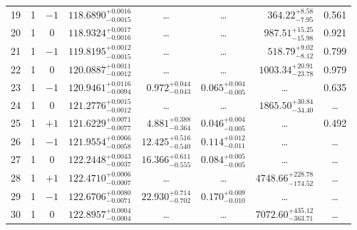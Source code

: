 \begin{table*}[!]
\begin{tabular}{llcrrlrc}
19 & 1 & $-1$ & $    118.6890_{-      0.0015}^{+      0.0016}$ & \multicolumn{1}{c}{\dots} & \multicolumn{1}{c}{\dots} & $      364.22_{-        7.95}^{+        8.58}$ & 0.561\\[1pt]
20 & 1 & 0 & $    118.9324_{-      0.0016}^{+      0.0017}$ & \multicolumn{1}{c}{\dots} & \multicolumn{1}{c}{\dots} & $      987.51_{-       15.98}^{+       15.25}$ & 0.921\\[1pt]
21 & 1 & $-1$ & $    119.8195_{-      0.0015}^{+      0.0012}$ & \multicolumn{1}{c}{\dots} & \multicolumn{1}{c}{\dots} & $      518.79_{-        8.12}^{+        9.02}$ & 0.799\\[1pt]
22 & 1 & 0 & $    120.0887_{-      0.0012}^{+      0.0011}$ & \multicolumn{1}{c}{\dots} & \multicolumn{1}{c}{\dots} & $     1003.34_{-       23.78}^{+       20.91}$ & 0.979\\[1pt]
23 & 1 & $-1$ & $    120.9461_{-      0.0094}^{+      0.0116}$ & $       0.972_{-       0.043}^{+       0.044}$ & $       0.065_{-       0.005}^{+       0.004}$ & \multicolumn{1}{c}{\dots} & 0.635\\[1pt]
24 & 1 & 0 & $    121.2776_{-      0.0012}^{+      0.0015}$ & \multicolumn{1}{c}{\dots} & \multicolumn{1}{c}{\dots} & $     1865.50_{-       34.40}^{+       30.84}$ & \dots \\[1pt]
25 & 1 & $+1$ & $    121.6229_{-      0.0077}^{+      0.0071}$ & $       4.881_{-       0.364}^{+       0.388}$ & $       0.046_{-       0.005}^{+       0.004}$ & \multicolumn{1}{c}{\dots} & 0.492\\[1pt]
26 & 1 & $-1$ & $    121.9554_{-      0.0058}^{+      0.0066}$ & $      12.425_{-       0.540}^{+       0.516}$ & $       0.114_{-       0.011}^{+       0.012}$ & \multicolumn{1}{c}{\dots} & \dots \\[1pt]
27 & 1 & 0 & $    122.2448_{-      0.0037}^{+      0.0043}$ & $      16.366_{-       0.555}^{+       0.611}$ & $       0.084_{-       0.005}^{+       0.005}$ & \multicolumn{1}{c}{\dots} & \dots \\[1pt]
28 & 1 & $+1$ & $    122.4710_{-      0.0007}^{+      0.0006}$ & \multicolumn{1}{c}{\dots} & \multicolumn{1}{c}{\dots} & $     4748.66_{-      174.52}^{+      228.78}$ & \dots \\[1pt]
29 & 1 & $-1$ & $    122.6706_{-      0.0071}^{+      0.0080}$ & $      22.930_{-       0.702}^{+       0.714}$ & $       0.170_{-       0.010}^{+       0.009}$ & \multicolumn{1}{c}{\dots} & \dots \\[1pt]
30 & 1 & 0 & $    122.8957_{-      0.0004}^{+      0.0004}$ & \multicolumn{1}{c}{\dots} & \multicolumn{1}{c}{\dots} & $     7072.60_{-      363.71}^{+      435.12}$ & \dots \\[1pt]

\end{tabular}
\end{table*}
